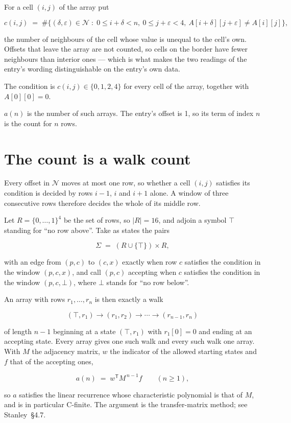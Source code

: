 \documentclass[11pt]{article}
\theoremstyle{definition}
\begin{document}
For a cell $(i,j)$ of the array put

\[c(i,j) \;=\; \#\bigl\{(\delta,\varepsilon)\in\mathcal{N} \;:\; 0\le i+\delta<n,\ 0\le j+\varepsilon<4,\ A[i+\delta][j+\varepsilon] \neq A[i][j]\bigr\},\]

the number of neighbours of the cell whose value is unequal to the cell's own. Offsets that leave the array are not counted, so cells on the border have fewer neighbours than interior ones --- which is what makes the two readings of the entry's wording distinguishable on the entry's own data.

The condition is $c(i,j) \in \{0, 1, 2, 4\}$ for every cell of the array, together with $A[0][0]=0$.

$a(n)$ is the number of such arrays. The entry's offset is 1, so its term of index $n$ is the count for $n$ rows.

\section{The count is a walk count}

Every offset in $\mathcal{N}$ moves at most one row, so whether a cell $(i,j)$ satisfies its condition is decided by rows $i-1$, $i$ and $i+1$ alone. A window of three consecutive rows therefore decides the whole of its middle row.

Let $R = \{0,\dots,1\}^{4}$ be the set of rows, so $|R| = 16$, and adjoin a symbol $\top$ standing for ``no row above''. Take as states the pairs

\[\Sigma \;=\; (R \cup \{\top\}) \times R,\]

with an edge from $(p,c)$ to $(c,x)$ exactly when row $c$ satisfies the condition in the window $(p,c,x)$, and call $(p,c)$ accepting when $c$ satisfies the condition in the window $(p,c,\bot)$, where $\bot$ stands for ``no row below''.

An array with rows $r_1,\dots,r_n$ is then exactly a walk

\[(\top,r_1) \to (r_1,r_2) \to \cdots \to (r_{n-1},r_n)\]

of length $n-1$ beginning at a state $(\top,r_1)$ with $r_1[0]=0$ and ending at an accepting state. Every array gives one such walk and every such walk one array. With $M$ the adjacency matrix, $w$ the indicator of the allowed starting states and $f$ that of the accepting ones,

\[a(n) \;=\; w^{\mathsf T} M^{\,n-1} f \qquad (n \ge 1),\]

so $a$ satisfies the linear recurrence whose characteristic polynomial is that of $M$, and is in particular C-finite. The argument is the transfer-matrix method; see Stanley~\S4.7.
\end{document}
